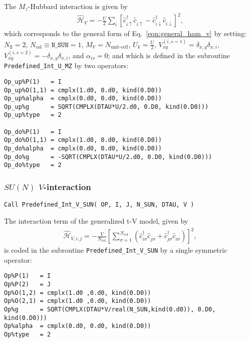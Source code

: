 The $M_z$-Hubbard interaction is given by 
\begin{align}
\hat{\mathcal{H}}_{V} = - \frac{U}{2}\sum\limits_{i}\left[
\hat{c}^{\dagger}_{i \uparrow} \hat{c}^{\phantom\dagger}_{i \uparrow}  -   \hat{c}^{\dagger}_{i \downarrow} \hat{c}^{\phantom\dagger}_{i \downarrow}  \right]^{2},
\end{align} 
which corresponds to the general form of Eq.~\eqref{eqn:general_ham_v} by setting: 
$N_{\mathrm{fl}} = 2$, $N_{\mathrm{col}} \equiv \texttt{N\_SUN} =1 $,  $M_V =  N_{\text{unit-cell}} $,  $U_{k} = \frac{U}{2}$, 
$V_{x y}^{(i, s=1)} =  \delta_{x,y} \delta_{x,i}  $,  $V_{x y}^{(i, s=2)} =  - \delta_{x,y} \delta_{x,i}  $, and $\alpha_{is}   = 0  $; and which is defined in the subroutine \texttt{Predefined\_Int\_U\_MZ} by two operators:
\begin{lstlisting}[style=fortran]
Op_up%P(1)   = I
Op_up%O(1,1) = cmplx(1.d0, 0.d0, kind(0.D0))
Op_up%alpha  = cmplx(0.d0, 0.d0, kind(0.D0))
Op_up%g      = SQRT(CMPLX(DTAU*U/2.d0, 0.D0, kind(0.D0))) 
Op_up%type   = 2

Op_do%P(1)   = I
Op_do%O(1,1) = cmplx(1.d0, 0.d0, kind(0.D0))
Op_do%alpha  = cmplx(0.d0, 0.d0, kind(0.D0))
Op_do%g      = -SQRT(CMPLX(DTAU*U/2.d0, 0.D0, kind(0.D0))) 
Op_do%type   = 2

\end{lstlisting}


\subsubsection{$SU(N)$ $V$-interaction}

\begin{lstlisting}[style=fortran]
Call Predefined_Int_V_SUN( OP, I, J, N_SUN, DTAU, V )
\end{lstlisting}

The interaction term of the generalized t-V model, given by 
\begin{align}
\hat{\mathcal{H}}_{V,i,j} =
-\frac{V}{N_\mathrm{col}}\left[ \sum_{\sigma=1}^{N_\mathrm{col}}\left( \hat{c}^{\dagger}_{i \sigma} \hat{c}^{\phantom\dagger}_{j \sigma} + \hat{c}^{\dagger}_{j \sigma} \hat{c}^{\phantom\dagger}_{i \sigma} \right) \right]^2,
\end{align} 
is coded in the subroutine \texttt{Predefined\_Int\_V\_SUN} by a single symmetric operator:
\begin{lstlisting}[style=fortran]
Op%P(1)   = I
Op%P(2)   = J
Op%O(1,2) = cmplx(1.d0 ,0.d0, kind(0.D0)) 
Op%O(2,1) = cmplx(1.d0 ,0.d0, kind(0.D0))
Op%g      = SQRT(CMPLX(DTAU*V/real(N_SUN,kind(0.d0)), 0.D0, kind(0.D0))) 
Op%alpha  = cmplx(0.d0, 0.d0, kind(0.D0))
Op%type   = 2

\end{lstlisting}


